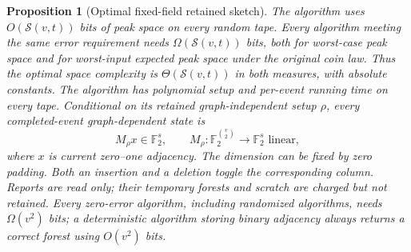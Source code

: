 \documentclass[11pt,letterpaper]{article}
\newtheorem{proposition}[theorem]{Proposition}
\numberwithin{equation}{section}
\begin{document}
\begin{proposition}[Optimal fixed-field retained sketch]
\label{prop:retained-binary-sketch}
The algorithm uses $O(\mathcal S(v,t))$ bits of peak space on every random tape.
Every algorithm meeting the same error requirement needs $\Omega(\mathcal S(v,t))$ bits, both for worst-case peak space and for worst-input expected peak space under the original coin law.
Thus the optimal space complexity is $\Theta(\mathcal S(v,t))$ in both measures, with absolute constants.
The algorithm has polynomial setup and per-event running time on every tape.
Conditional on its retained graph-independent setup $\rho$, every completed-event graph-dependent state is
\begin{equation}
M_\rho x\in\mathbb F_2^s,\qquad
 M_\rho:\mathbb F_2^{\binom{v}{2}}\longrightarrow\mathbb F_2^s
 \text{ linear},                                      \label{eq:lf2}
\end{equation}
where $x$ is current zero--one adjacency.
The dimension can be fixed by zero padding.
Both an insertion and a deletion toggle the corresponding column.
Reports are read only; their temporary forests and scratch are charged but not retained.
Every zero-error algorithm, including randomized algorithms, needs $\Omega(v^2)$ bits; a deterministic algorithm storing binary adjacency always returns a correct forest using $O(v^2)$ bits.
\end{proposition}
\end{document}
